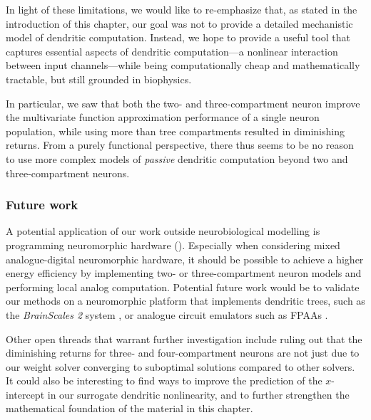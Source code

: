 In light of these limitations, we would like to re-emphasize that, as stated in the introduction of this chapter, our goal was not to provide a detailed mechanistic model of dendritic computation.
Instead, we hope to provide a useful tool that captures essential aspects of dendritic computation---a nonlinear interaction between input channels---while being computationally cheap and mathematically tractable, but still grounded in biophysics.

In particular, we saw that both the two- and three-compartment neuron improve the multivariate function approximation performance of a single neuron population, while using more than tree compartments resulted in diminishing returns.
From a purely functional perspective, there thus seems to be no reason to use more complex models of \emph{passive} dendritic computation beyond two and three-compartment neurons.

\subsubsection{Future work}
A potential application of our work outside neurobiological modelling is programming neuromorphic hardware ().
Especially when considering mixed analogue-digital neuromorphic hardware, it should be possible to achieve a higher energy efficiency by implementing two- or three-compartment neuron models and performing local analog computation.
Potential future work would be to validate our methods on a neuromorphic platform that implements dendritic trees, such as the \emph{BrainScales 2} system \citep{schemmel2017accelerated}, or analogue circuit emulators such as FPAAs \citep[e.g.,][]{george2016programmable}.

Other open threads that warrant further investigation include ruling out that the diminishing returns for three- and four-compartment neurons are not just due to our weight solver converging to suboptimal solutions compared to other solvers.
It could also be interesting to find ways to improve the prediction of the $x$-intercept in our surrogate dendritic nonlinearity, and to further strengthen the mathematical foundation of the material in this chapter.
